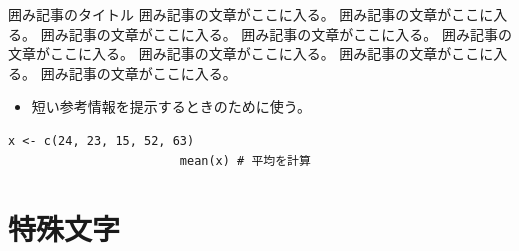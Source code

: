 \documentclass[ %
	uplatex,%
	a5paper,%
	papersize%
	]{jsbook}
\newcommand{\sanko}[1]{%
					\begin{itemize}
						\item[\mysbox{\small\gtfamily 参考}] #1
					\end{itemize}
					}
\begin{document}
						\begin{note}{囲み記事のタイトル}
							囲み記事の文章がここに入る。
							囲み記事の文章がここに入る。
							囲み記事の文章がここに入る。
							囲み記事の文章がここに入る。
							囲み記事の文章がここに入る。
							囲み記事の文章がここに入る。
							囲み記事の文章がここに入る。
							囲み記事の文章がここに入る。
						\end{note}


						\sanko{短い参考情報を提示するときのために使う。}

						\begin{lstlisting}[caption=簡単なプログラムの例, label=ls:example]
						x <- c(24, 23, 15, 52, 63)
						mean(x) # 平均を計算
						\end{lstlisting}


						\section{特殊文字}

						   
						   
						   
						   

						   
						   
						   
						   

						   
						   
						   
						   


						     

						     

						     

						\backmatter
						\printindex

					
\end{document}
